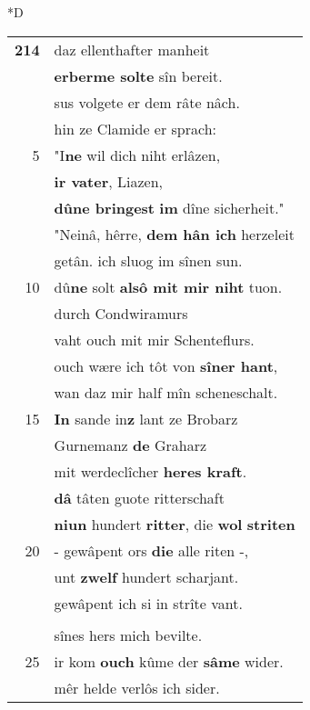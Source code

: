 \documentclass[8pt,a4paper,notitlepage]{article}
\begin{document}
\begin{table}[ht]
\begin{minipage}[t]{0.5\linewidth}
\small
\begin{center}*D
\end{center}
\begin{tabular}{rl}
\textbf{214} & daz ellenthafter manheit\\ 
 & \textbf{erberme solte} sîn bereit.\\ 
 & sus volgete er dem râte nâch.\\ 
 & hin ze Clamide er sprach:\\ 
5 & "I\textbf{ne} wil dich niht erlâzen,\\ 
 & \textbf{ir vater}, Liazen,\\ 
 & \textbf{dûne bringest} \textbf{im} dîne sicherheit."\\ 
 & "Neinâ, hêrre, \textbf{dem hân ich} herzeleit\\ 
 & getân. ich sluog im sînen sun.\\ 
10 & dû\textbf{ne} solt \textbf{alsô mit mir niht} tuon.\\ 
 & durch Condwiramurs\\ 
 & vaht ouch mit mir Schenteflurs.\\ 
 & ouch wære ich tôt von \textbf{sîner hant},\\ 
 & wan daz mir half mîn scheneschalt.\\ 
15 & \textbf{In} sande in\textbf{z} lant ze Brobarz\\ 
 & Gurnemanz \textbf{de} Graharz\\ 
 & mit werdeclîcher \textbf{heres kraft}.\\ 
 & \textbf{dâ} tâten guote ritterschaft\\ 
 & \textbf{niun} hundert \textbf{ritter}, die \textbf{wol} \textbf{striten}\\ 
20 & - gewâpent ors \textbf{die} alle riten -,\\ 
 & unt \textbf{zwelf} hundert scharjant.\\ 
 & gewâpent ich si in strîte vant.\\ 
 & \textbf{\textit{\begin{large}D\end{large}}en} gebrast niht wan der schilte.\\ 
 & sînes hers mich bevilte.\\ 
25 & ir kom \textbf{ouch} kûme der \textbf{sâme} wider.\\ 
 & mêr helde verlôs ich sider.\\ 

\end{tabular}
\end{minipage}
\end{table}
\end{document}
